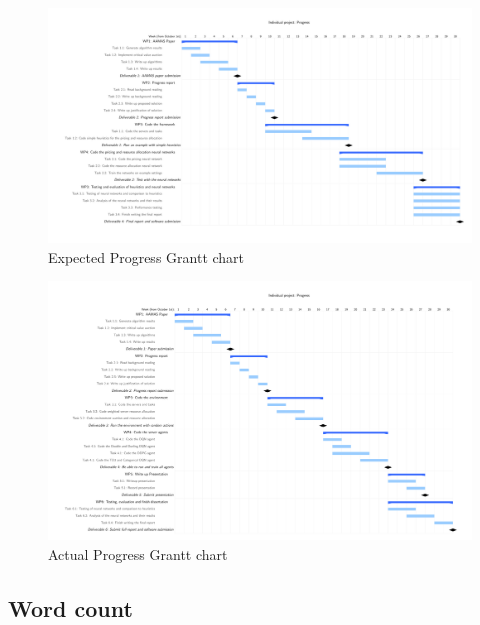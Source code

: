 \begin{figure}[H]
    \centering
    \includegraphics[width=13cm]{extra/expected_progress_grantt_chart.pdf}
    \caption{Expected Progress Grantt chart}
    \label{fig:expected-progress-grantt-chart}
\end{figure}

\begin{figure}[H]
    \centering
    \includegraphics[width=14cm]{extra/progress_grantt_chart.pdf}
    \caption{Actual Progress Grantt chart}
    \label{fig:progress-grant-chart}
\end{figure}



\subsection*{Word count}
\wordcount

